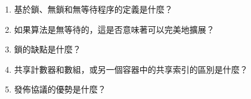 \begin{enumerate}
\item 
基於鎖、無鎖和無等待程序的定義是什麼？

\item 
如果算法是無等待的，這是否意味著可以完美地擴展？

\item 
鎖的缺點是什麼？

\item
共享計數器和數組，或另一個容器中的共享索引的區別是什麼？

\item
發佈協議的優勢是什麼？
\end{enumerate}